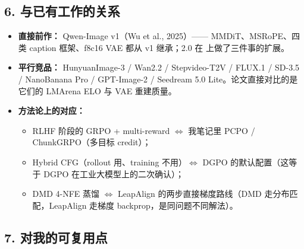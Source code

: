 \subsection{6. 与已有工作的关系}

\begin{itemize}[leftmargin=1.5em]
  \item \textbf{直接前作：} Qwen-Image v1（Wu et al., 2025）—— MMDiT、MSRoPE、四类 caption 框架、f8c16 VAE 都从 v1 继承；2.0 在  上做了三件事的扩展。
  \item \textbf{平行竞品：} HunyuanImage-3 / Wan2.2 / Stepvideo-T2V / FLUX.1 / SD-3.5 / NanoBanana Pro / GPT-Image-2 / Seedream 5.0 Lite。论文直接对比的是它们的 LMArena ELO 与 VAE 重建质量。
  \item \textbf{方法论上的对应：}
    \begin{itemize}[leftmargin=1.5em]
      \item RLHF 阶段的 GRPO + multi-reward $\Leftrightarrow$ 我笔记里 PCPO / ChunkGRPO（多目标 credit）；
      \item Hybrid CFG（rollout 用、training 不用）$\Leftrightarrow$ DGPO 的默认配置（这等于 DGPO 在工业大模型上的二次确认）；
      \item DMD 4-NFE 蒸馏 $\Leftrightarrow$ LeapAlign 的两步直接梯度路线（DMD 走分布匹配，LeapAlign 走梯度 backprop，是同问题不同解法）。
    \end{itemize}
\end{itemize}

\subsection{7. 对我的可复用点}

